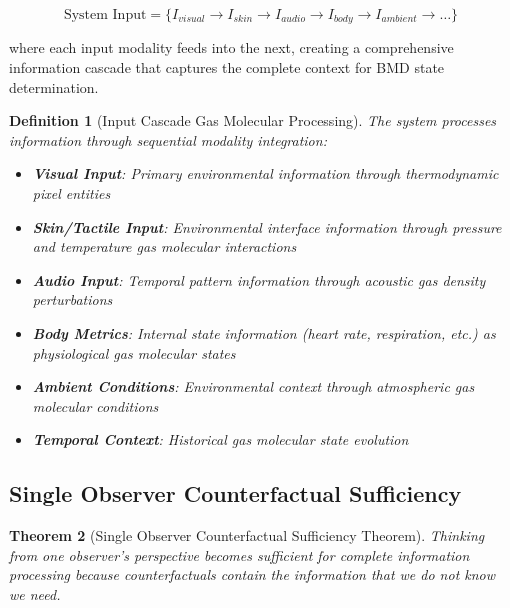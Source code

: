 \documentclass[11pt,a4paper]{article}
\newtheorem{theorem}{Theorem}[section]
\newtheorem{definition}[theorem]{Definition}
\begin{document}
\begin{equation}
\text{System Input} = \{I_{visual} \rightarrow I_{skin} \rightarrow I_{audio} \rightarrow I_{body} \rightarrow I_{ambient} \rightarrow \ldots\}
\end{equation}

where each input modality feeds into the next, creating a comprehensive information cascade that captures the complete context for BMD state determination.

\begin{definition}[Input Cascade Gas Molecular Processing]
The system processes information through sequential modality integration:
\begin{itemize}
\item \textbf{Visual Input}: Primary environmental information through thermodynamic pixel entities
\item \textbf{Skin/Tactile Input}: Environmental interface information through pressure and temperature gas molecular interactions
\item \textbf{Audio Input}: Temporal pattern information through acoustic gas density perturbations
\item \textbf{Body Metrics}: Internal state information (heart rate, respiration, etc.) as physiological gas molecular states
\item \textbf{Ambient Conditions}: Environmental context through atmospheric gas molecular conditions
\item \textbf{Temporal Context}: Historical gas molecular state evolution
\end{itemize}
\end{definition}

\subsection{Single Observer Counterfactual Sufficiency}

\begin{theorem}[Single Observer Counterfactual Sufficiency Theorem]
Thinking from one observer's perspective becomes sufficient for complete information processing because counterfactuals contain the information that we do not know we need.
\end{theorem}
\end{document}
